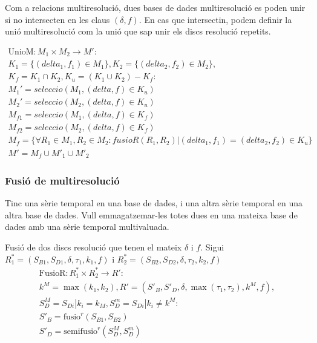 Com a relacions multiresolució, dues bases de dades multiresolució es
poden unir si no intersecten en les claus $(\delta,f)$.  En cas que
intersectin, podem definir la unió multiresolució com la unió que sap unir els discs resolució repetits.

\begin{gather*}
    \text{UnioM}: M_1 \times M_2 \longrightarrow M': \\
    K_1 = \{(delta_1,f_1) \in M_1\},K_2 = \{(delta_2,f_2) \in M_2\}, \\
    K_f = K_1 \cap K_2, K_u =  (K_1 \cup K_2) - K_f : \\
    M_1'= seleccio(M_1, (delta,f) \in K_u)\\
    M_2'= seleccio(M_2, (delta,f) \in K_u)\\
    M_{f1} = seleccio(M_1, (delta,f) \in K_f) \\
    M_{f2} = seleccio(M_2, (delta,f) \in K_f) \\
    M_f = \{\forall R_1\in M_1,R_2\in M_2: fusioR(R_1,R_2) |
       (delta_1,f_1) = (delta_2,f_2) \in K_u  \} \\
    M' =  M_{f} \cup  M'_{1}  \cup  M'_{2}     
\end{gather*}






\subsubsection{Fusió de multiresolució}

Tinc una sèrie temporal en una base de dades, i una altra sèrie temporal en una altra base de dades. Vull emmagatzemar-les totes dues en una mateixa base de dades amb una sèrie temporal multivaluada.


Fusió de dos discs resolució que tenen el mateix $\delta$ i $f$.
Sigui $R_1^*=(S_{B1},S_{D1},\delta,\tau_1,k_1,f)$ i
$R_2^*=(S_{B2},S_{D2},\delta,\tau_2,k_2,f)$
  \begin{gather*}
    \text{FusioR}: R_1^* \times R_2^* \longrightarrow R': \\
    k^M=\max(k_1,k_2), R' = (S'_B,S'_D,\delta,\max(\tau_1,\tau_2),k^M,f), \\
    S^M_D = S_{Di} | k_i = k_M,  S^m_D = S_{Di} | k_i \neq k^M   : \\
    S'_B = \text{fusio}^r(S_{B1},S_{B2})\\
    S'_D = \text{semifusio}^r(S^M_{D},S^m_{D})
\end{gather*}


